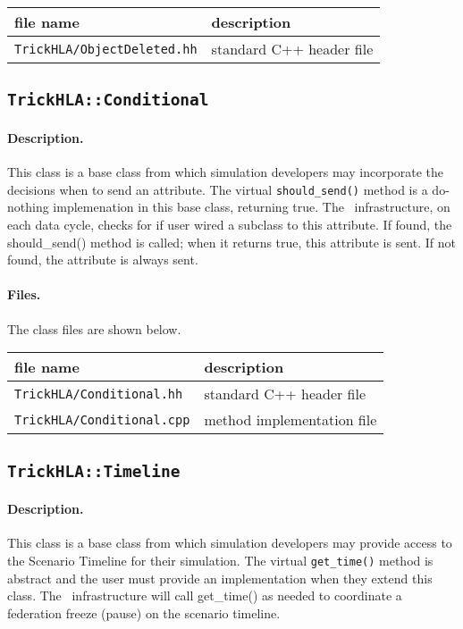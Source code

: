 {
  \scriptsize
  \begin{tabular}{|l|l|} 
    \hline
    file name & description \\
    \hline \hline
    {\tt TrickHLA/ObjectDeleted.hh} 
    & standard C++ header file
    \\ \hline
  \end{tabular}
}

\subsection{{\tt TrickHLA::Conditional}}

\paragraph{Description.}
This class is a base class from which simulation developers may
incorporate the decisions when to send an attribute.
\newline
The virtual {\tt should\_send()} method is a do-nothing implemenation 
in this base class, returning true.
\newline
The \TrickHLA\ infrastructure, on each data cycle, checks for if user wired a
subclass to this attribute. If found, the should\_send() method is called; when
it returns true, this attribute is sent. If not found, the attribute is
always sent.

\paragraph{Files.}
The class files are shown below.

{
  \scriptsize
  \begin{tabular}{|l|l|}
    \hline
    file name & description \\
    \hline \hline
    {\tt TrickHLA/Conditional.hh}
    & standard C++ header file
    \\ \hline
    {\tt TrickHLA/Conditional.cpp}
    & method implementation file
    \\ \hline
  \end{tabular}
}

\subsection{{\tt TrickHLA::Timeline}}

\paragraph{Description.}
This class is a base class from which simulation developers may
provide access to the Scenario Timeline for their simulation.
\newline
The virtual {\tt get\_time()} method is abstract and the user must provide an
implementation when they extend this class.
\newline
The \TrickHLA\ infrastructure will call get\_time() as needed to coordinate
a federation freeze (pause) on the scenario timeline.

